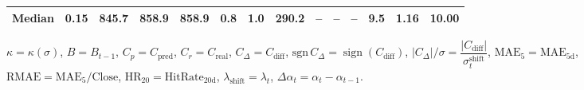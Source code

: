 \begin{threeparttable}
{\begin{tabular}{lrrrrrrrrrrrrr}
 Median &     0.15 & 845.7 &  858.9 & 858.9 &        0.8 &                      1.0 &               290.2 &         -- &        -- &             -- &              9.5 &            1.16 &                  10.00 \\
\bottomrule
\end{tabular}
}%
\begin{tablenotes}\footnotesize
\item $\kappa=\kappa(\sigma)$, $B=B_{t-1}$, $C_p=C_{\text{pred}}$, $C_r=C_{\text{real}}$, $C_\Delta=C_{\text{diff}}$, $\mathrm{sgn}\,C_\Delta=\operatorname{sign}(C_{\text{diff}})$, $|C_\Delta|/\sigma=\dfrac{|C_{\text{diff}}|}{\sigma_t^{\text{shift}}}$, $\mathrm{MAE}_5=\mathrm{MAE}_{5\text{d}}$, $\mathrm{RMAE}= \mathrm{MAE}_5 / \text{Close}$, $\mathrm{HR}_{20}=\mathrm{HitRate}_{20\text{d}}$, 
$\lambda_{\text{shift}}=\lambda_t$, 
$\Delta\alpha_t=\alpha_t-\alpha_{t-1}$.
\end{tablenotes}
\end{threeparttable}
\endgroup